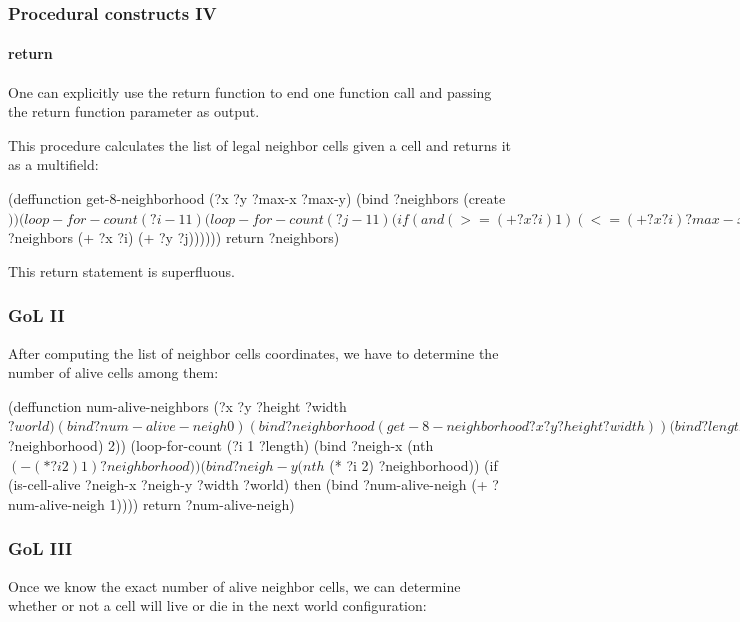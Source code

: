 \documentclass[xcolor={usenames,dvipsnames,svgnames}, compress]{beamer}
\begin{document}
\begin{frame}[fragile]
  \frametitle{Procedural constructs IV}
  \framesubtitle{return}
  One can explicitly use the \textsf{return} function to end one
  function call and passing the \textsf{return} function parameter as
  output.\par
  This procedure calculates the list of legal neighbor cells given a
  cell and returns it as a multifield:
  \begin{clips-code}[numbers=none]
    (deffunction get-8-neighborhood
        (?x ?y ?max-x ?max-y)
        (bind ?neighbors (create$))
        (loop-for-count (?i -1 1)
            (loop-for-count (?j -1 1)
                (if (and (>= (+ ?x ?i) 1)
                         (<= (+ ?x ?i) ?max-x)
                         (>= (+ ?y ?j) 1)
                         (<= (+ ?y ?j) ?max-y)
                         (or (<> ?i 0) (<> ?j 0)))
                    then (bind ?neighbors
                         (create$ ?neighbors (+ ?x ?i) (+ ?y ?j))))))
        return ?neighbors)
  \end{clips-code}
  This return statement is superfluous.    
\end{frame}

\begin{frame}[fragile]
  \frametitle{GoL II}
  After computing the list of neighbor cells coordinates, we have to
  determine the number of alive cells among them:
  \begin{clips-code}[numbers=none]
    (deffunction num-alive-neighbors
    (?x ?y ?height ?width $?world)
    (bind ?num-alive-neigh 0)
    (bind ?neighborhood (get-8-neighborhood ?x ?y ?height ?width))
    (bind ?length (div (length$ ?neighborhood) 2))
    (loop-for-count (?i 1 ?length)
        (bind ?neigh-x (nth$ (- (* ?i 2) 1) ?neighborhood))
        (bind ?neigh-y (nth$ (* ?i 2) ?neighborhood))
        (if (is-cell-alive ?neigh-x ?neigh-y ?width ?world)
            then (bind ?num-alive-neigh (+ ?num-alive-neigh 1))))
    return ?num-alive-neigh)
  \end{clips-code}
\end{frame}

\begin{frame}[fragile]
  \frametitle{GoL III}
  Once we know the exact number of alive neighbor cells, we can
  determine whether or not a cell will live or die in the next world
  configuration:
\end{frame}
\end{document}
